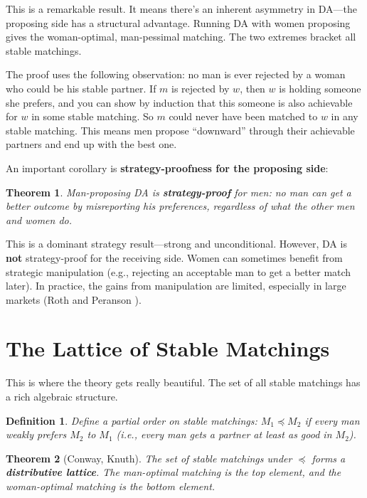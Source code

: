 \documentclass[11pt]{article}
\newtheorem{theorem}{Theorem}
\newtheorem{definition}{Definition}
\begin{document}
This is a remarkable result. It means there's an inherent asymmetry in DA---the proposing side has a structural advantage. Running DA with women proposing gives the woman-optimal, man-pessimal matching. The two extremes bracket all stable matchings.

The proof uses the following observation: no man is ever rejected by a woman who could be his stable partner. If $m$ is rejected by $w$, then $w$ is holding someone she prefers, and you can show by induction that this someone is also achievable for $w$ in some stable matching. So $m$ could never have been matched to $w$ in any stable matching. This means men propose ``downward'' through their achievable partners and end up with the best one.

An important corollary is \textbf{strategy-proofness for the proposing side}:

\begin{theorem}
Man-proposing DA is \textbf{strategy-proof} for men: no man can get a better outcome by misreporting his preferences, regardless of what the other men and women do.
\end{theorem}

This is a dominant strategy result---strong and unconditional. However, DA is \textbf{not} strategy-proof for the receiving side. Women can sometimes benefit from strategic manipulation (e.g., rejecting an acceptable man to get a better match later). In practice, the gains from manipulation are limited, especially in large markets (Roth and Peranson \cite{roth1999}).

\section{The Lattice of Stable Matchings}

This is where the theory gets really beautiful. The set of all stable matchings has a rich algebraic structure.

\begin{definition}
Define a partial order on stable matchings: $M_1 \preceq M_2$ if every man weakly prefers $M_2$ to $M_1$ (i.e., every man gets a partner at least as good in $M_2$).
\end{definition}

\begin{theorem}[Conway, Knuth]
The set of stable matchings under $\preceq$ forms a \textbf{distributive lattice}. The man-optimal matching is the top element, and the woman-optimal matching is the bottom element.
\end{theorem}
\end{document}
